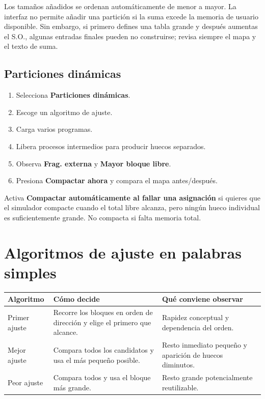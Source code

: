 \documentclass[11pt,a4paper]{article}
\newcommand{\control}[1]{\textsf{\textbf{#1}}}
\begin{document}
Los tamaños añadidos se ordenan automáticamente de menor a mayor. La interfaz no
permite añadir una partición si la suma excede la memoria de usuario disponible.
Sin embargo, si primero defines una tabla grande y después aumentas el S.O., algunas
entradas finales pueden no construirse; revisa siempre el mapa y el texto de suma.

\subsection{Particiones dinámicas}

\begin{enumerate}
  \item Selecciona \control{Particiones dinámicas}.
  \item Escoge un algoritmo de ajuste.
  \item Carga varios programas.
  \item Libera procesos intermedios para producir huecos separados.
  \item Observa \control{Frag. externa} y \control{Mayor bloque libre}.
  \item Presiona \control{Compactar ahora} y compara el mapa antes/después.
\end{enumerate}

Activa \control{Compactar automáticamente al fallar una asignación} si quieres que
el simulador compacte cuando el total libre alcanza, pero ningún hueco individual
es suficientemente grande. No compacta si falta memoria total.

\section{Algoritmos de ajuste en palabras simples}

\begin{longtable}{p{}p{}p{}}
\toprule
\textbf{Algoritmo} & \textbf{Cómo decide} & \textbf{Qué conviene observar}\\
\midrule
\endhead
Primer ajuste & Recorre los bloques en orden de dirección y elige el primero que alcance. & Rapidez conceptual y dependencia del orden.\\
Mejor ajuste & Compara todos los candidatos y usa el más pequeño posible. & Resto inmediato pequeño y aparición de huecos diminutos.\\
Peor ajuste & Compara todos y usa el bloque más grande. & Resto grande potencialmente reutilizable.\\
\bottomrule
\end{longtable}
\end{document}
